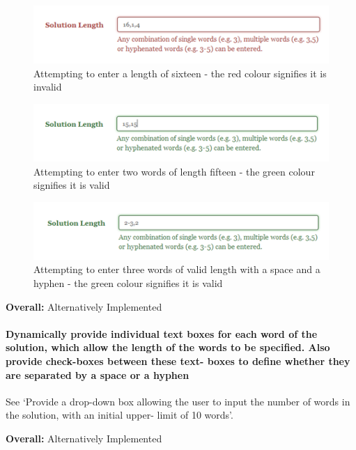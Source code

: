 \begin{figure}[H]
	\centering
	\includegraphics[scale=0.8]{evidence/dropdown1.png}
	\caption{Attempting to enter a length of sixteen - the red colour signifies it
	is invalid}
\end{figure}

\begin{figure}[H]
	\centering
	\includegraphics[scale=0.8]{evidence/dropdown2.png}
	\caption{Attempting to enter two words of length fifteen - the green colour 
	signifies it is valid}
\end{figure}

\begin{figure}[H]
	\centering
	\includegraphics[scale=0.8]{evidence/dropdown3.png}
	\caption{Attempting to enter three words of valid length with a space and a 
	hyphen - the green colour signifies it is valid}
\end{figure}

{\bf Overall:} Alternatively Implemented


\paragraph{Dynamically provide individual text boxes for each word of the
solution, which allow the length of the words to be specified. Also provide
check-boxes between these text- boxes to define whether they are separated by a
space or a hyphen}

See `Provide a drop-down box allowing the user to input the number of words in
the solution, with an initial upper- limit of 10 words'.

{\bf Overall:} Alternatively Implemented


